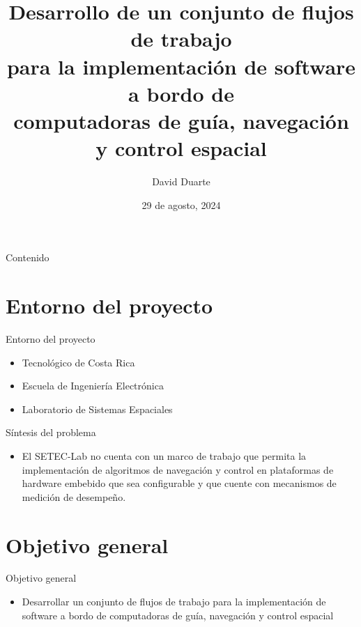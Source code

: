 \documentclass[10pt,aspectratio=169]{beamer} %
\title[Anteproyecto]{Desarrollo de un conjunto de flujos de trabajo \\
                                  para la implementación de software a bordo de  \\
                                  computadoras de guía, navegación y control espacial}
\institute[TEC]{Escuela de Ingeniería Electrónica \\ Tecnológico de Costa Rica}
\date[Noviembre 2023]{29 de agosto, 2024}
\author[D.\ Duarte]{David Duarte}
\begin{document}
\graphicspath{{./}{./fig/}}

\begin{frame}
  \titlepage
\end{frame}


\begin{frame}{Contenido}
  \tableofcontents
\end{frame}

\section{Entorno del proyecto}

\begin{frame}{Entorno del proyecto}
  \begin{itemize}
  \item Tecnológico de Costa Rica
  \item Escuela de Ingeniería Electrónica
  \item Laboratorio de Sistemas Espaciales
  \end{itemize}
\end{frame}

\begin{frame}{Síntesis del problema}
  
  \begin{itemize}
  \item El SETEC-Lab no cuenta con un marco de trabajo que permita la implementación 
  de algoritmos de navegación y control en plataformas de hardware embebido que sea 
  configurable y que cuente con mecanismos de medición de desempeño.
  \end{itemize}
\end{frame}
\section{Objetivo general}
\begin{frame}{Objetivo general}
  
  \begin{itemize}
  \item Desarrollar un conjunto de flujos de trabajo para la implementación de software 
  a bordo de computadoras de guía, navegación y control espacial 
  \end{itemize}
\end{frame}
\end{document}
